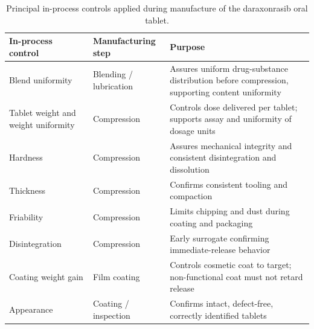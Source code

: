 \begin{table}[t]
\centering
\caption{Principal in-process controls applied during manufacture of the
daraxonrasib oral tablet.}
\label{tab:cmc-ipc}
\begin{tabularx}{\textwidth}{L{3.4cm} L{3.6cm} Y}
\toprule
\textbf{In-process control} & \textbf{Manufacturing step} & \textbf{Purpose} \\
\midrule
Blend uniformity & Blending / lubrication & Assures uniform drug-substance distribution before compression, supporting content uniformity \\
Tablet weight and weight uniformity & Compression & Controls dose delivered per tablet; supports assay and uniformity of dosage units \\
Hardness & Compression & Assures mechanical integrity and consistent disintegration and dissolution \\
Thickness & Compression & Confirms consistent tooling and compaction \\
Friability & Compression & Limits chipping and dust during coating and packaging \\
Disintegration & Compression & Early surrogate confirming immediate-release behavior \\
Coating weight gain & Film coating & Controls cosmetic coat to target; non-functional coat must not retard release \\
Appearance & Coating / inspection & Confirms intact, defect-free, correctly identified tablets \\
\bottomrule
\end{tabularx}
\end{table}

